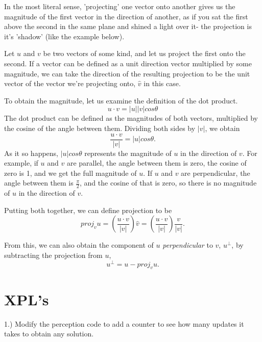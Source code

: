 In the most literal sense, 'projecting' one vector onto another gives us the magnitude of the first vector in the direction of another, as if you sat the first above the second in the same plane and shined a light over it- the projection is it's 'shadow' (like the example below).


Let $u$ and $v$ be two vectors of some kind, and let us project the first onto the second. If a vector can be defined as a unit direction vector multiplied by some magnitude, we can take the direction of the resulting projection to be the unit vector of the vector we're projecting onto, $\hat{v}$ in this case.

To obtain the magnitude, let us examine the definition of the dot product.
\[
    u \cdot v = |u||v|cos\theta
\]
The dot product can be defined as the magnitudes of both vectors, multiplied by the cosine of the angle between them. Dividing both sides by $|v|$, we obtain
\[
    \frac{u \cdot v}{|v|} = |u|cos\theta.
\]
As it so happens, $|u|cos\theta$ represents the magnitude of $u$ in the direction of $v$. For example, if $u$ and $v$ are parallel, the angle between them is zero, the cosine of zero is 1, and we get the full magnitude of $u$. If $u$ and $v$ are perpendicular, the angle between them is $\frac{\pi}{2}$, and the cosine of that is zero, so there is no magnitude of $u$ in the direction of $v$.

Putting both together, we can define projection to be
\[
    proj_vu = (\frac{u \cdot v}{|v|})\hat{v} = (\frac{u \cdot v}{|v|})\frac{v}{|v|}.
\]

From this, we can also obtain the component of $u$ \textit{perpendicular} to $v$, $u^\perp$, by subtracting the projection from $u$,
\[
    u^\perp = u - proj_vu.
\]

\section{XPL's}
1.) Modify the perception code to add a counter to see how many updates it takes to obtain any solution.











